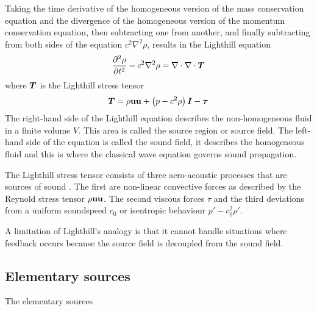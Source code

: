 Taking the time derivative of the homogeneous version of the mass conservation
equation and the divergence of the homogeneous version of the momentum
conservation equation, then subtracting one from another, and finally
subtracting from both sides of the equation $c^2 \nabla^2 \rho$, results in the
Lighthill equation
\begin{equation}
  \frac{\partial^2 \rho}{\partial t^2} - c^2 \nabla^2 \rho = \nabla \cdot \nabla \cdot \bm{T}
\end{equation}
where $\bm{T}$ is the Lighthill stress tensor
\begin{equation}
  \bm{T} = \rho \mathbf{u}\mathbf{u} + \left( p - c^2 \rho \right) \bm{I} - \bm{\tau}
\end{equation}
The right-hand side of the Lighthill equation describes the non-homogeneous
fluid in a finite volume $V$. This area is called the source region or source
field. The left-hand side of the equation is called the sound field, it
describes the homogeneous fluid and this is where the classical wave equation
governs sound propagation.

The Lighthill stress tensor consists of three aero-acoustic processes that are
sources of sound \cite{Rienstra2017}. The first are non-linear convective forces
as described by the Reynold stress tensor $\rho \mathbf{u}\mathbf{u}$. The second
viscous forces $\tau$ and the third deviations from a uniform soundspeed
$c_0$ or isentropic behaviour $p' - c_0^2 \rho'$. 

A limitation of Lighthill's analogy is that it cannot handle situations where
feedback occurs because the source field is decoupled from the sound field.







\subsection{Elementary sources}

The elementary sources 


